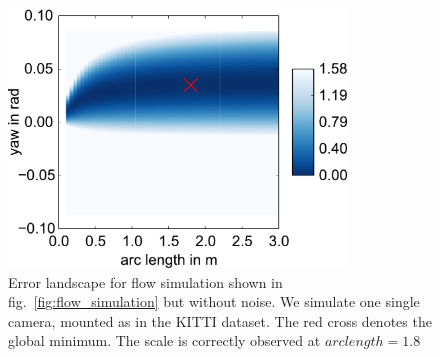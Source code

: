 \documentclass[a4paper]{article}
\begin{document}
\begin{figure}[htb]
\centering
\includegraphics[width=0.8\textwidth]{landscape_scale}
\caption{Error landscape for flow simulation shown in fig.~\ref{fig:flow_simulation} but without noise. We simulate one single camera, mounted as in the KITTI dataset. The red cross denotes the global minimum. The scale is correctly observed at $arc length=1.8$ }
\label{fig:landscape_scale}
\end{figure}
\end{document}
